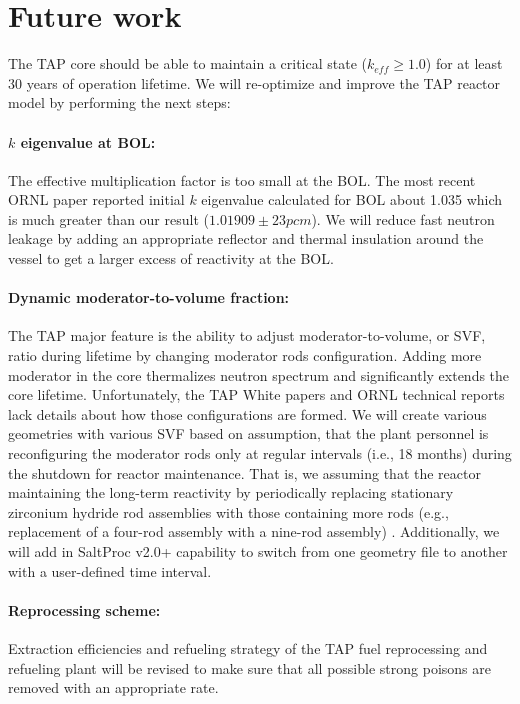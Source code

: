 \documentclass[12pt]{article} %
\begin{document}
\section{Future work}
The \gls{TAP} core should be able to maintain a critical state ($k_{eff}\geq 1.0$) 
for at least 30 years of operation lifetime. We will re-optimize and improve the 
\gls{TAP} reactor model by performing the next steps:
\paragraph{$k$ eigenvalue at \gls{BOL}:} The effective multiplication factor is 
too small at the \gls{BOL}. The most recent 
\gls{ORNL} paper \cite{betzler_fuel_2018} reported initial $k$ eigenvalue calculated 
for \gls{BOL} about 1.035 which is much greater than our result 
($1.01909\pm23pcm$). We will reduce fast neutron leakage by adding an appropriate 
reflector and thermal insulation around the vessel to get a larger excess of 
reactivity at the \gls{BOL}.
\paragraph{Dynamic moderator-to-volume fraction:} The \gls{TAP} major feature is 
the ability to adjust moderator-to-volume, or \gls{SVF}, ratio during lifetime 
by changing moderator rods configuration. Adding more moderator in the core 
thermalizes neutron spectrum and significantly extends the core lifetime. 
Unfortunately, the \gls{TAP} White 
papers and \gls{ORNL} technical reports lack details about how those configurations 
are formed. 
We will create various geometries with various \gls{SVF} based on assumption, 
that the plant personnel is reconfiguring the
moderator rods only at regular intervals (i.e., 18 months) during the shutdown for 
reactor maintenance. That is, we assuming that the reactor maintaining
the long-term reactivity by periodically replacing stationary
zirconium hydride rod assemblies with those containing more rods
(e.g., replacement of a four-rod assembly with a nine-rod assembly) 
\cite{betzler_fuel_2018}. 
Additionally, we will add in SaltProc v2.0+ capability to switch from one 
geometry file to another with a user-defined time interval. 
\paragraph{Reprocessing scheme:} Extraction efficiencies and refueling strategy 
of the \gls{TAP} fuel reprocessing and refueling plant will be revised to make 
sure that all possible strong poisons are removed with an appropriate rate.




%

\end{document}
